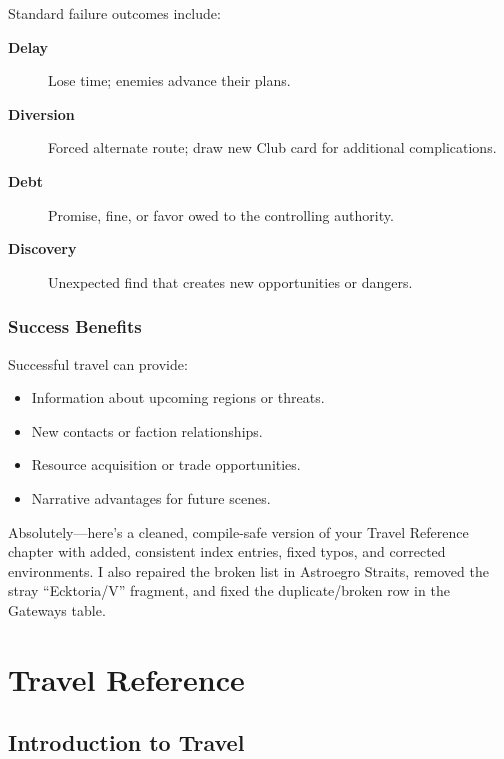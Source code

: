 Standard failure outcomes include:
\begin{description}
\item[\textbf{Delay}] Lose time; enemies advance their plans.
\item[\textbf{Diversion}] Forced alternate route; draw new Club card for additional complications.
\item[\textbf{Debt}] Promise, fine, or favor owed to the controlling authority.
\item[\textbf{Discovery}] Unexpected find that creates new opportunities or dangers.
\end{description}

\subsection{Success Benefits}
\label{subsec:success-benefits}

Successful travel can provide:
\begin{itemize}
\item Information about upcoming regions or threats.
\item New contacts or faction relationships.
\item Resource acquisition or trade opportunities.
\item Narrative advantages for future scenes.
\end{itemize}

Absolutely—here’s a cleaned, compile-safe version of your Travel Reference chapter with added, consistent index entries, fixed typos, and corrected environments. I also repaired the broken list in Astroegro Straits, removed the stray “Ecktoria/V” fragment, and fixed the duplicate/broken row in the Gateways table.

\chapter{Travel Reference}
\label{chap:travel-reference}

\section{Introduction to Travel}
\label{sec:travel-intro}

